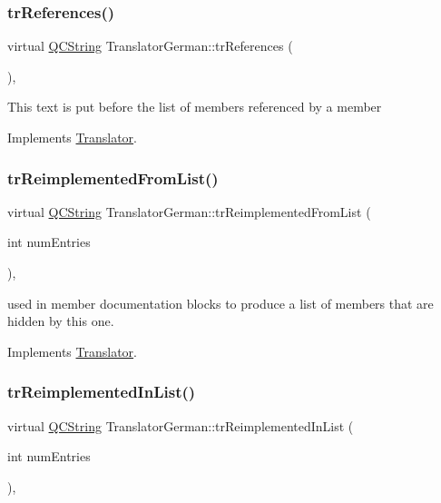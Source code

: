 \subsubsection{\texorpdfstring{trReferences()}{trReferences()}}
{\footnotesize\ttfamily virtual \mbox{\hyperlink{class_q_c_string}{Q\+C\+String}} Translator\+German\+::tr\+References (\begin{DoxyParamCaption}{ }\end{DoxyParamCaption})\hspace{0.3cm}{\ttfamily [inline]}, {\ttfamily [virtual]}}

This text is put before the list of members referenced by a member 

Implements \mbox{\hyperlink{class_translator}{Translator}}.

\mbox{\label{class_translator_german_aab61107851d8501e691717f1679d84bf}} 
\subsubsection{\texorpdfstring{trReimplementedFromList()}{trReimplementedFromList()}}
{\footnotesize\ttfamily virtual \mbox{\hyperlink{class_q_c_string}{Q\+C\+String}} Translator\+German\+::tr\+Reimplemented\+From\+List (\begin{DoxyParamCaption}\item[{int}]{num\+Entries }\end{DoxyParamCaption})\hspace{0.3cm}{\ttfamily [inline]}, {\ttfamily [virtual]}}

used in member documentation blocks to produce a list of members that are hidden by this one. 

Implements \mbox{\hyperlink{class_translator}{Translator}}.

\mbox{\label{class_translator_german_a826a3147af5ccb1434ca8d58dbf873b0}} 
\subsubsection{\texorpdfstring{trReimplementedInList()}{trReimplementedInList()}}
{\footnotesize\ttfamily virtual \mbox{\hyperlink{class_q_c_string}{Q\+C\+String}} Translator\+German\+::tr\+Reimplemented\+In\+List (\begin{DoxyParamCaption}\item[{int}]{num\+Entries }\end{DoxyParamCaption})\hspace{0.3cm}{\ttfamily [inline]}, {\ttfamily [virtual]}}


